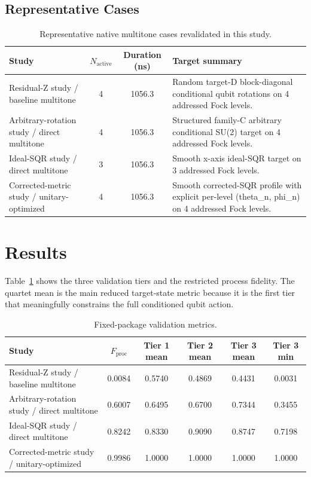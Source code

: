 \documentclass[aps,pra,twocolumn,reprint,amsmath,amssymb]{revtex4-2}
\begin{document}
\subsection{Representative Cases}
\begin{table}[t]
\centering
\caption{Representative native multitone cases revalidated in this study.}
\begin{tabular}{@{} l c c l @{}}
\toprule
Study & $N_{\mathrm{active}}$ & Duration (ns) & Target summary \\
\midrule
Residual-Z study / baseline multitone & 4 & 1056.3 & Random target-D block-diagonal conditional qubit rotations on 4 addressed Fock levels. \\
Arbitrary-rotation study / direct multitone & 4 & 1056.3 & Structured family-C arbitrary conditional SU(2) target on 4 addressed Fock levels. \\
Ideal-SQR study / direct multitone & 3 & 1056.3 & Smooth x-axis ideal-SQR target on 3 addressed Fock levels. \\
Corrected-metric study / unitary-optimized & 4 & 1056.3 & Smooth corrected-SQR profile with explicit per-level (theta\_n, phi\_n) on 4 addressed Fock levels. \\
\bottomrule
\end{tabular}
\end{table}

\section{Results}
Table~\ref{tab:tiers} shows the three validation tiers and the restricted process fidelity. The quartet mean is the main reduced target-state metric because it is the first tier that meaningfully constrains the full conditioned qubit action.

\begin{table}[t]
\centering
\caption{Fixed-package validation metrics.}
\label{tab:tiers}
\begin{tabular}{@{} l c c c c c @{}}
\toprule
Study & $F_\mathrm{proc}$ & Tier 1 mean & Tier 2 mean & Tier 3 mean & Tier 3 min \\
\midrule
Residual-Z study / baseline multitone & 0.0084 & 0.5740 & 0.4869 & 0.4431 & 0.0031 \\
Arbitrary-rotation study / direct multitone & 0.6007 & 0.6495 & 0.6700 & 0.7344 & 0.3455 \\
Ideal-SQR study / direct multitone & 0.8242 & 0.8330 & 0.9090 & 0.8747 & 0.7198 \\
Corrected-metric study / unitary-optimized & 0.9986 & 1.0000 & 1.0000 & 1.0000 & 1.0000 \\
\bottomrule
\end{tabular}
\end{table}
\end{document}
